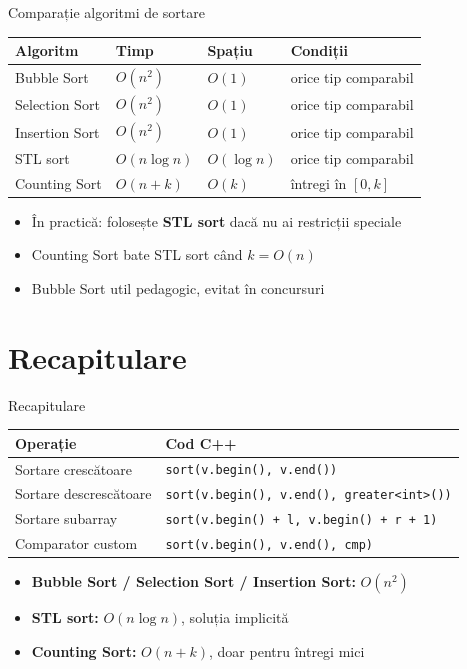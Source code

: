 ﻿\documentclass{beamer}
\begin{document}
\begin{frame}{Comparație algoritmi de sortare}
  \begin{center}
  \begin{tabular}{llll}
    \toprule
    Algoritm & Timp & Spațiu & Condiții \\
    \midrule
    Bubble Sort    & $O(n^2)$      & $O(1)$      & orice tip comparabil \\
    Selection Sort & $O(n^2)$      & $O(1)$      & orice tip comparabil \\
    Insertion Sort & $O(n^2)$      & $O(1)$      & orice tip comparabil \\
    STL sort       & $O(n \log n)$ & $O(\log n)$ & orice tip comparabil \\
    Counting Sort  & $O(n + k)$    & $O(k)$      & întregi în $[0, k]$ \\
    \bottomrule
  \end{tabular}
  \end{center}
  \bigskip
  \begin{itemize}
    \item În practică: folosește \textbf{STL sort} dacă nu ai restricții speciale
    \item Counting Sort bate STL sort când $k = O(n)$
    \item Bubble Sort \textemdash{} util pedagogic, evitat în concursuri
  \end{itemize}
\end{frame}

\section{Recapitulare}

\begin{frame}[fragile]{Recapitulare}
  \begin{center}
  \begin{tabular}{ll}
    \toprule
    Operație & Cod C++ \\
    \midrule
    Sortare crescătoare    & \lstinline|sort(v.begin(), v.end())| \\
    Sortare descrescătoare & \lstinline|sort(v.begin(), v.end(), greater<int>())| \\
    Sortare subarray       & \lstinline[keepspaces=true]|sort(v.begin() + l, v.begin() + r + 1)| \\
    Comparator custom      & \lstinline|sort(v.begin(), v.end(), cmp)| \\
    \bottomrule
  \end{tabular}
  \end{center}
  \bigskip
  \begin{itemize}
    \item \textbf{Bubble Sort / Selection Sort / Insertion Sort:} $O(n^2)$
    \item \textbf{STL sort:} $O(n \log n)$, soluția implicită
    \item \textbf{Counting Sort:} $O(n+k)$, doar pentru întregi mici
  \end{itemize}
\end{frame}
\end{document}
